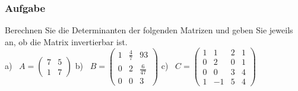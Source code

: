 \documentclass[a4paper,11pt]{scrartcl}
\newcounter{auf}
\newcommand{\Aufgabe}%
        {\addtocounter{auf}{1} \subsubsection*{\rmfamily  Aufgabe \theauf \hspace{1em}} }
\begin{document}
\newpage
\Aufgabe
Berechnen Sie die Determinanten der folgenden Matrizen und geben Sie jeweils an, ob die Matrix invertierbar ist.\\
%
\hspace*{10mm} a) \ $A=\begin{pmatrix} 7 & 5 \\ 1 & 7 \end{pmatrix}$ \qquad
b) \ $B=\begin{pmatrix} 1 & \frac{4}{7} & 93 \\ 0 & 2 & \frac{6}{47} \\ 0 & 0& 3 \end{pmatrix}$ \qquad
c) \ $C=\begin{pmatrix} 1 & 1 &  2 & 1 \\ 0 & 2 & 0 & 1 \\ 0 & 0& 3 & 4 \\ 1 & -1 & 5 & 4 \end{pmatrix}$
\end{document}
